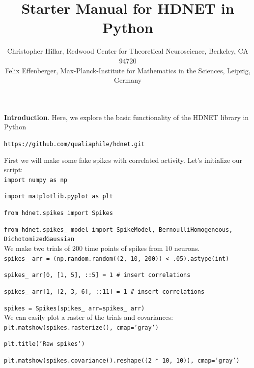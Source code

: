 \documentclass[letter, 12pt]{article}
\theoremstyle{definition}
\theoremstyle{remark}
\begin{document}
\title{Starter Manual for HDNET in Python}
\author{\normalsize Christopher Hillar, Redwood Center for Theoretical Neuroscience, Berkeley, CA 94720\\
\normalsize Felix Effenberger, Max-Planck-Institute for Mathematics in the Sciences, Leipzig, Germany
}
\date{}



\maketitle



\textbf{Introduction}.  Here, we explore the basic functionality of the HDNET library in Python
\begin{center}
\texttt{https://github.com/qualiaphile/hdnet.git} \\
\end{center}

First we will make some fake spikes with correlated activity.  Let's initialize our script: \\

\texttt{import numpy as np}

\texttt{import matplotlib.pyplot as plt}

\texttt{from hdnet.spikes import Spikes}

\texttt{from hdnet.spikes\_\,model import SpikeModel, BernoulliHomogeneous, DichotomizedGaussian}  \\

We make two trials of 200 time points of spikes from $10$ neurons.   \\

\texttt{spikes\_\,arr = (np.random.random((2, 10, 200)) < .05).astype(int)}

\texttt{spikes\_\,arr[0, [1, 5], ::5] = 1 \# insert correlations}

\texttt{spikes\_\,arr[1, [2, 3, 6], ::11] = 1  \# insert correlations}

\texttt{spikes = Spikes(spikes\_\,arr=spikes\_\,arr)} \\

We can easily plot a raster of the trials and covariances: \\

\texttt{plt.matshow(spikes.rasterize(), cmap='gray')} 

\texttt{plt.title('Raw spikes')}

\texttt{plt.matshow(spikes.covariance().reshape((2 * 10, 10)), cmap='gray')}
\end{document}
